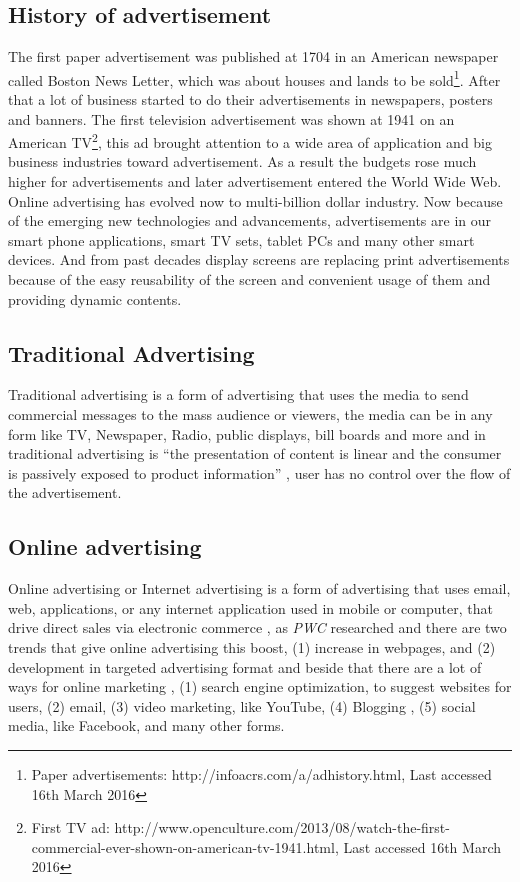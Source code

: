 \subsection{History of advertisement}
The first paper advertisement was published at 1704 in an American newspaper called Boston News Letter, which was about houses and lands to be sold\footnote{Paper advertisements: http://infoacrs.com/a/adhistory.html, Last accessed 16th March 2016}. After that a lot of business started to do their advertisements in newspapers, posters and banners. The first television advertisement was shown at 1941 on an American TV\footnote {First TV ad: http://www.openculture.com/2013/08/watch-the-first-commercial-ever-shown-on-american-tv-1941.html, Last accessed 16th March 2016}, this ad brought attention to a wide area of application and big business industries toward advertisement. As a result the budgets rose much higher for advertisements and later advertisement entered the World Wide Web. Online advertising has evolved now to multi-billion dollar industry. Now because of the emerging new technologies and advancements, advertisements are in our smart phone applications, smart TV sets, tablet PCs and many other smart devices. And from past decades display screens are replacing print advertisements because of the easy reusability of the screen and convenient usage of them and providing dynamic contents.

\subsection{Traditional Advertising}
Traditional advertising is a form of advertising that uses the media to send commercial messages to the mass audience or viewers, the media can be in any form like TV, Newspaper, Radio, public displays, bill boards and more and in traditional advertising is “the presentation of content is linear and the consumer is passively exposed to product information” \cite{Non_inter_vs_interAd}, user has no control over the flow of the advertisement. 

\subsection{Online advertising}
Online advertising or Internet advertising is a form of advertising that uses email, web, applications, or any internet application used in mobile or computer, that drive direct sales via electronic commerce \cite{onlinead}, as \emph{PWC}  \cite{pwc} researched and there are two trends that give online advertising this boost, (1) increase in webpages, and (2) development in targeted advertising format and beside that there are a lot of ways for online marketing \cite{waysmarketing}, (1) search engine optimization, to suggest websites for users, (2) email, (3) video marketing, like YouTube, (4) Blogging , (5) social media, like Facebook, and many other forms.

